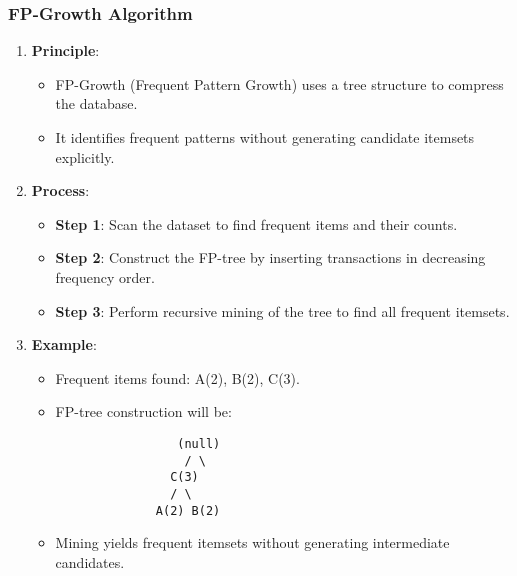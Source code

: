 \documentclass{beamer}
\begin{document}
\begin{frame}[fragile]
    \frametitle{FP-Growth Algorithm}
    \begin{enumerate}
        \item \textbf{Principle}:
        \begin{itemize}
            \item FP-Growth (Frequent Pattern Growth) uses a tree structure to compress the database.
            \item It identifies frequent patterns without generating candidate itemsets explicitly.
        \end{itemize}

        \item \textbf{Process}:
        \begin{itemize}
            \item \textbf{Step 1}: Scan the dataset to find frequent items and their counts.
            \item \textbf{Step 2}: Construct the FP-tree by inserting transactions in decreasing frequency order.
            \item \textbf{Step 3}: Perform recursive mining of the tree to find all frequent itemsets.
        \end{itemize}

        \item \textbf{Example}:
        \begin{itemize}
            \item Frequent items found: A(2), B(2), C(3).
            \item FP-tree construction will be:
            \begin{lstlisting}
                 (null)
                  / \
                C(3) 
                / \
              A(2) B(2)
            \end{lstlisting}
            \item Mining yields frequent itemsets without generating intermediate candidates.
        \end{itemize}
    \end{enumerate}
\end{frame}
\end{document}
